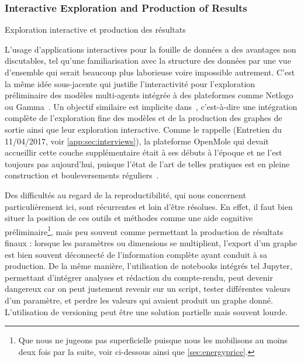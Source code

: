 \subsubsection{Interactive Exploration and Production of Results}{Exploration interactive et production des résultats}

L'usage d'applications interactives pour la fouille de données a des avantages non discutables, tel qu'une familiarisation avec la structure des données par une vue d'ensemble qui serait beaucoup plus laborieuse voire impossible autrement. C'est la même idée sous-jacente qui justifie l'interactivité pour l'exploration préliminaire des modèles multi-agents intégrée à des plateformes comme Netlogo~\cite{wilensky1999netlogo} ou Gamma~\cite{drogoul2013gama}. Un objectif similaire est implicite dans~\cite{rey2015plateforme}, c'est-à-dire une intégration complète de l'exploration fine des modèles et de la production des graphes de sortie ainsi que leur exploration interactive. Comme le rappelle  (Entretien du 11/04/2017, voir \ref{app:sec:interviews}), la plateforme OpenMole qui devait accueillir cette couche supplémentaire était à ses débuts à l'époque et ne l'est toujours pas aujourd'hui, puisque l'état de l'art de telles pratiques est en pleine construction et bouleversements réguliers~\cite{holzinger2014knowledge}.


Des difficultés au regard de la reproductibilité, qui nous concernent particulièrement ici, sont récurrentes et loin d'être résolues. En effet, il faut bien situer la position de ces outils et méthodes comme une aide cognitive préliminaire\footnote{Que nous ne jugeons pas superficielle puisque nous les mobilisons au moins deux fois par la suite, voir ci-dessous ainsi que \ref{sec:energyprice}.}, mais peu souvent comme permettant la production de résultats finaux : lorsque les paramètres ou dimensions se multiplient, l'export d'un graphe est bien souvent déconnecté de l'information complète ayant conduit à sa production. De la même manière, l'utilisation de notebooks intégrés tel Jupyter, permettant d'intégrer analyses et rédaction du compte-rendu, peut devenir dangereux car on peut justement revenir sur un script, tester différentes valeurs d'un paramètre, et perdre les valeurs qui avaient produit un graphe donné. L'utilisation de versioning peut être une solution partielle mais souvent lourde.


